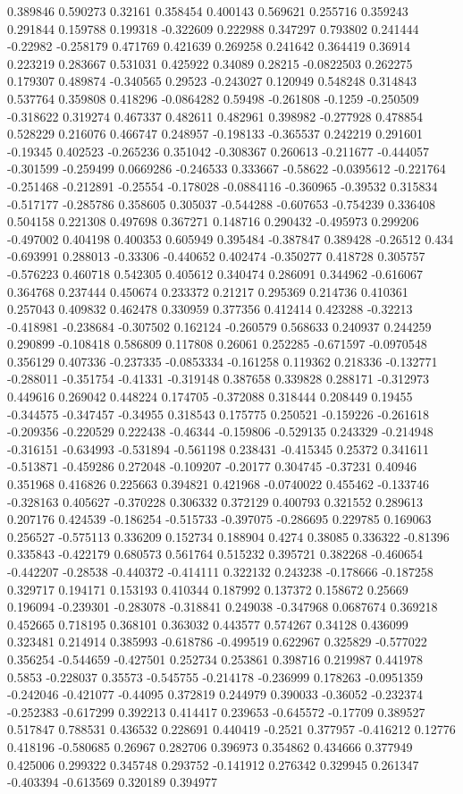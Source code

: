 0.389846 0.590273 0.32161 0.358454 0.400143 0.569621 0.255716 0.359243 0.291844 0.159788 0.199318 -0.322609 0.222988 0.347297 0.793802 0.241444 -0.22982 -0.258179 0.471769 0.421639 0.269258 0.241642 0.364419 0.36914 0.223219 0.283667 0.531031 0.425922 0.34089 0.28215 -0.0822503 0.262275 0.179307 0.489874 -0.340565 0.29523 -0.243027 0.120949 0.548248 0.314843 0.537764 0.359808 0.418296 -0.0864282 0.59498 -0.261808 -0.1259 -0.250509 -0.318622 0.319274 0.467337 0.482611 0.482961 0.398982 -0.277928 0.478854 0.528229 0.216076 0.466747 0.248957 -0.198133 -0.365537 0.242219 0.291601 -0.19345 0.402523 -0.265236 0.351042 -0.308367 0.260613 -0.211677 -0.444057 -0.301599 -0.259499 0.0669286 -0.246533 0.333667 -0.58622 -0.0395612 -0.221764 -0.251468 -0.212891 -0.25554 -0.178028 -0.0884116 -0.360965 -0.39532 0.315834 -0.517177 -0.285786 0.358605 0.305037 -0.544288 -0.607653 -0.754239 0.336408 0.504158 0.221308 0.497698 0.367271 0.148716 0.290432 -0.495973 0.299206 -0.497002 0.404198 0.400353 0.605949 0.395484 -0.387847 0.389428 -0.26512 0.434 -0.693991 0.288013 -0.33306 -0.440652 0.402474 -0.350277 0.418728 0.305757 -0.576223 0.460718 0.542305 0.405612 0.340474 0.286091 0.344962 -0.616067 0.364768 0.237444 0.450674 0.233372 0.21217 0.295369 0.214736 0.410361 0.257043 0.409832 0.462478 0.330959 0.377356 0.412414 0.423288 -0.32213 -0.418981 -0.238684 -0.307502 0.162124 -0.260579 0.568633 0.240937 0.244259 0.290899 -0.108418 0.586809 0.117808 0.26061 0.252285 -0.671597 -0.0970548 0.356129 0.407336 -0.237335 -0.0853334 -0.161258 0.119362 0.218336 -0.132771 -0.288011 -0.351754 -0.41331 -0.319148 0.387658 0.339828 0.288171 -0.312973 0.449616 0.269042 0.448224 0.174705 -0.372088 0.318444 0.208449 0.19455 -0.344575 -0.347457 -0.34955 0.318543 0.175775 0.250521 -0.159226 -0.261618 -0.209356 -0.220529 0.222438 -0.46344 -0.159806 -0.529135 0.243329 -0.214948 -0.316151 -0.634993 -0.531894 -0.561198 0.238431 -0.415345 0.25372 0.341611 -0.513871 -0.459286 0.272048 -0.109207 -0.20177 0.304745 -0.37231 0.40946 0.351968 0.416826 0.225663 0.394821 0.421968 -0.0740022 0.455462 -0.133746 -0.328163 0.405627 -0.370228 0.306332 0.372129 0.400793 0.321552 0.289613 0.207176 0.424539 -0.186254 -0.515733 -0.397075 -0.286695 0.229785 0.169063 0.256527 -0.575113 0.336209 0.152734 0.188904 0.4274 0.38085 0.336322 -0.81396 0.335843 -0.422179 0.680573 0.561764 0.515232 0.395721 0.382268 -0.460654 -0.442207 -0.28538 -0.440372 -0.414111 0.322132 0.243238 -0.178666 -0.187258 0.329717 0.194171 0.153193 0.410344 0.187992 0.137372 0.158672 0.25669 0.196094 -0.239301 -0.283078 -0.318841 0.249038 -0.347968 0.0687674 0.369218 0.452665 0.718195 0.368101 0.363032 0.443577 0.574267 0.34128 0.436099 0.323481 0.214914 0.385993 -0.618786 -0.499519 0.622967 0.325829 -0.577022 0.356254 -0.544659 -0.427501 0.252734 0.253861 0.398716 0.219987 0.441978 0.5853 -0.228037 0.35573 -0.545755 -0.214178 -0.236999 0.178263 -0.0951359 -0.242046 -0.421077 -0.44095 0.372819 0.244979 0.390033 -0.36052 -0.232374 -0.252383 -0.617299 0.392213 0.414417 0.239653 -0.645572 -0.17709 0.389527 0.517847 0.788531 0.436532 0.228691 0.440419 -0.2521 0.377957 -0.416212 0.12776 0.418196 -0.580685 0.26967 0.282706 0.396973 0.354862 0.434666 0.377949 0.425006 0.299322 0.345748 0.293752 -0.141912 0.276342 0.329945 0.261347 -0.403394 -0.613569 0.320189 0.394977 